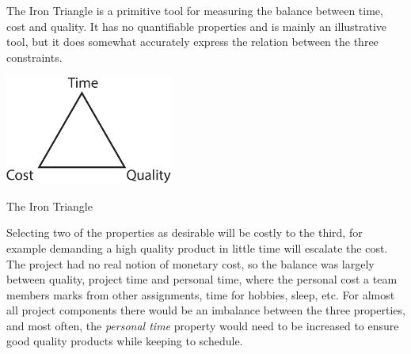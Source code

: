 The Iron Triangle is a primitive tool for measuring the balance between time, cost and quality. It has no quantifiable properties and is mainly an illustrative tool, but it does somewhat accurately express the relation between the three constraints.
\begin{marginfigure}
	\includegraphics[width=55mm]{res/pm/TCQ_triangle}
	\label{fig:TCQ_triangle}
	\caption{The Iron Triangle}
\end{marginfigure}
Selecting two of the properties as desirable will be costly to the third, for example demanding a high quality product in little time will escalate the cost. The project had no real notion of monetary cost, so the balance was largely between quality, project time and personal time, where the personal cost a team members marks from other assignments, time for hobbies, sleep, etc. For almost all project components there would be an imbalance between the three properties, and most often, the \emph{personal time} property would need to be increased to ensure good quality products while keeping to schedule.  


